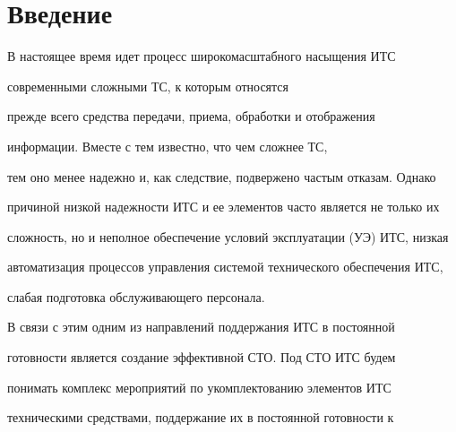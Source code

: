 

  













      \thispagestyle{headings}





      





            







  


  \section{Введение}


  В настоящее время идет процесс широкомасштабного насыщения ИТС 


современными сложными ТС, к которым относятся 


прежде всего средства передачи, приема, обработки и отображения 


информации. Вместе с тем известно, что чем сложнее ТС, 


тем оно менее надежно и, как следствие, подвержено частым отказам. Однако 


причиной низкой на\-деж\-ности ИТС и ее элементов часто является не только их 


сложность, но и неполное обеспечение условий эксплуатации (УЭ) ИТС, низкая 


автоматизация процессов управления системой технического обеспечения ИТС, 


слабая подготовка обслуживающего персонала. 


  


  В связи с этим одним из направлений поддержания ИТС в постоянной 


готовности является создание эффективной СТО. Под СТО ИТС будем 


понимать комплекс мероприятий по укомплектованию элементов ИТС 


техническими средствами, поддержание их в постоянной готовности к 


